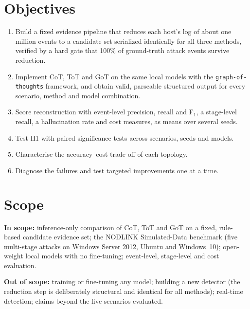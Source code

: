 \section{Objectives}
\begin{enumerate}
\item Build a fixed evidence pipeline that reduces each host's log of about one million events to a candidate set serialized identically for all three methods, verified by a hard gate that 100\% of ground-truth attack events survive reduction.
\item Implement CoT, ToT and GoT on the same local models with the \texttt{graph-of-thoughts} framework, and obtain valid, parseable structured output for every scenario, method and model combination.
\item Score reconstruction with event-level precision, recall and F$_1$, a stage-level recall, a hallucination rate and cost measures, as means over several seeds.
\item Test H1 with paired significance tests across scenarios, seeds and models.
\item Characterise the accuracy--cost trade-off of each topology.
\item Diagnose the failures and test targeted improvements one at a time.
\end{enumerate}

\section{Scope}
\textbf{In scope:} inference-only comparison of CoT, ToT and GoT on a fixed, rule-based candidate evidence set; the NODLINK Simulated-Data benchmark (five multi-stage attacks on Windows Server 2012, Ubuntu and Windows~10); open-weight local models with no fine-tuning; event-level, stage-level and cost evaluation.

\textbf{Out of scope:} training or fine-tuning any model; building a new detector (the reduction step is deliberately structural and identical for all methods); real-time detection; claims beyond the five scenarios evaluated.


